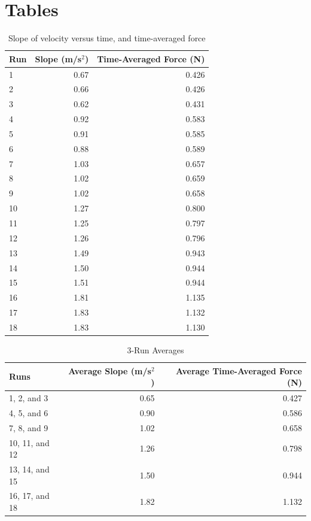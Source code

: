\section{Tables}
\begin{table}[ht]
    \centering
    \begin{tabular}{|l|r|r|}
        \hline
        \textbf{Run} & \textbf{Slope} (m/s$^{2}$) & \textbf{Time-Averaged Force} (N) \\
        \hline
        1 & 0.67 & 0.426 \\
        2 & 0.66 & 0.426 \\
        3 & 0.62 & 0.431 \\
        \hline
        4 & 0.92 & 0.583 \\
        5 & 0.91 & 0.585 \\
        6 & 0.88 & 0.589 \\
        \hline
        7 & 1.03 & 0.657 \\
        8 & 1.02 & 0.659 \\
        9 & 1.02 & 0.658 \\
        \hline
        10 & 1.27 & 0.800 \\
        11 & 1.25 & 0.797 \\
        12 & 1.26 & 0.796 \\
        \hline
        13 & 1.49 & 0.943 \\
        14 & 1.50 & 0.944 \\
        15 & 1.51 & 0.944 \\
        \hline
        16 & 1.81 & 1.135 \\
        17 & 1.83 & 1.132 \\
        18 & 1.83 & 1.130 \\
        \hline
    \end{tabular}
    \caption{Slope of velocity versus time, and time-averaged force}
    \label{table:04.results}
\end{table}
\begin{table}[ht]
    \centering
    \begin{tabular}{|l|r|r|}
        \hline
        \textbf{Runs} & \textbf{Average Slope} (m/s$^{2}$) & \textbf{Average Time-Averaged Force} (N) \\
        \hline
        1, 2, and 3 & 0.65 & 0.427 \\
        4, 5, and 6 & 0.90 & 0.586 \\
        7, 8, and 9 & 1.02 & 0.658 \\
        10, 11, and 12 & 1.26 & 0.798 \\
        13, 14, and 15 & 1.50 & 0.944 \\
        16, 17, and 18 & 1.82 & 1.132 \\
        \hline
    \end{tabular}
    \caption{3-Run Averages}
    \label{table:04.averages}
\end{table}
